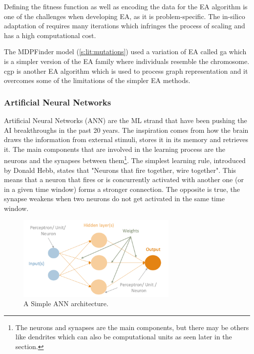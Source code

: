 Defining the fitness function as well as encoding the data for the EA algorithm is one of the challenges when developing EA, as it is problem-specific. The in-silico adaptation of  requires many iterations which infringes the process of scaling and has a high computational cost.

The MDPFinder model (\cref{s:lit:mutations}) used a variation of EA called \acrfull{ga} which is a simpler version of the EA family where individuals resemble the chromosome. \acrfull{cgp} is another EA algorithm which is used to process graph representation and it overcomes some of the limitations of the simpler EA methods. 


\subsubsection{Artificial Neural Networks} \label{s:lit:ann_overview}

Artificial Neural Networks (ANN) are the ML strand that have been pushing the AI breakthroughs in the past 20 years. The inspiration comes from how the brain draws the information from external stimuli, stores it in its memory and retrieves it. The main components that are involved in the learning process are the neurons and the synapses between them\footnote{The neurons and synapses are the main components, but there may be others like dendrites which can also be computational units as seen later in the section.}. The simplest learning rule, introduced by Donald Hebb, states that "Neurons that fire together, wire together"\cite{Hebb_Donald1949-nn}. This means that a neuron that fires or is concurrently activated with another one (or in a given time window) forms a stronger connection. The opposite is true, the synapse weakens when two neurons do not get activated in the same time window. 

\begin{figure}[!htb]
  \centering\includegraphics[width=0.7\textwidth,height=0.7\textheight,keepaspectratio]{Sections/Lit_review/Resources/Basic_ANN.png}
    \caption{A Simple ANN architecture. }
    \label{fig:ann_basic}
\end{figure}
\FloatBarrier

